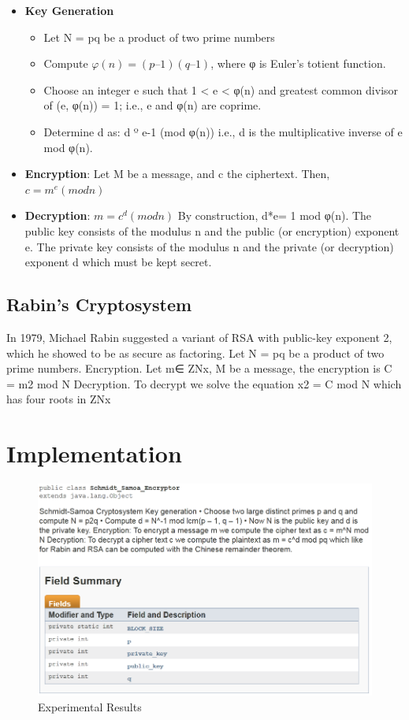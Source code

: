 \documentclass[12pt]{article} %
\begin{document}
\begin{itemize}
\item{\textbf{Key Generation}}
\begin{itemize}
\item{}Let N = pq be a product of two prime numbers
\item{}Compute $φ(n) = (p – 1)(q – 1)$, where φ is Euler's totient function.
\item{}Choose an integer e such that 1 < e < φ(n) and greatest common divisor of (e, φ(n)) = 1; i.e., e and φ(n) are coprime.
\item{}Determine d as: d º e-1 (mod φ(n)) i.e., d is the multiplicative inverse of e mod φ(n).
 \end{itemize}

\item{\textbf{Encryption}}:    Let M be a message, and c the ciphertext. Then,
        	$c = m^e (mod n)$
\item{\textbf{Decryption}}:  $m = c^d (mod n)$
By construction, d*e= 1 mod φ(n). The public key consists of the modulus n and the public (or encryption) exponent e. The private key consists of the modulus n and the private (or decryption) exponent d which must be kept secret.
\end{itemize}
\subsection{Rabin’s Cryptosystem}
In 1979, Michael Rabin suggested a variant of RSA with public-key exponent 2, which he showed to be as secure as factoring.
Let N = pq be a product of two prime numbers.
Encryption. Let m∈   ZNx, M be a message, the encryption is
C = m2 mod N
Decryption. To decrypt we solve the equation
x2 = C mod N
which has four roots in ZNx



\section{Implementation}

\begin{figure}[h!]
  \centering
   \includegraphics[scale=1.0]{schmidt_field.png}
  \caption{Experimental Results}
\end{figure}
\end{document}
